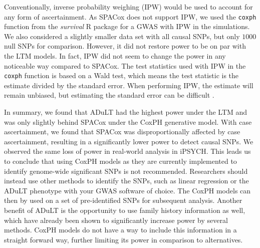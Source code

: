 Conventionally, inverse probability weighing (IPW) would be used to account for any form of ascertainment. As SPACox does not support IPW, we used the \texttt{coxph} function from the \textit{survival} R package \cite{Therneau2020-xf} for a GWAS with IPW in the simulations. We also considered a slightly smaller data set with all causal SNPs, but only $ 1000 $ null SNPs for comparison. However, it did not restore power to be on par with the LTM models. In fact, IPW did not seem to change the power in any noticeable way compared to SPACox. The test statistics used with IPW in the \texttt{coxph} function is based on a Wald test\cite{survivalVignette}, which means the test statistic is the estimate divided by the standard error. When performing IPW, the estimate will remain unbiased, but estimating the standard error can be difficult \cite{austin2016variance}. 


In summary, we found that ADuLT had the highest power under the LTM and was only slightly behind SPACox under the CoxPH generative model. With case ascertainment, we found that SPACox was disproportionally affected by case ascertainment, resulting in a significantly lower power to detect causal SNPs. We observed the same loss of power in real-world analysis in iPSYCH. This leads us to conclude that using CoxPH models as they are currently implemented to identify genome-wide significant SNPs is not recommended. Researchers should instead use other methods to identify the SNPs, such as linear regression or the ADuLT phenotype with your GWAS software of choice. The CoxPH models can then by used on a set of pre-identified SNPs for subsequent analysis. Another benefit of ADuLT is the opportunity to use family history information as well, which have already been shown to significantly increase power by several methods. CoxPH models do not have a way to include this information in a straight forward way, further limiting its power in comparison to alternatives.










